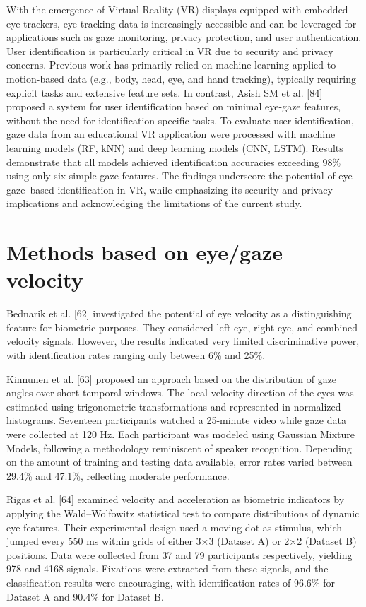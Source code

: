 \documentclass[12pt]{report}
\begin{document}
With the emergence of Virtual Reality (VR) displays equipped with embedded eye trackers, eye-tracking data is increasingly accessible and can be leveraged for applications such as gaze monitoring, privacy protection, and user authentication.
User identification is particularly critical in VR due to security and privacy concerns. 
Previous work has primarily relied on machine learning applied to motion-based data (e.g., body, head, eye, and hand tracking), typically requiring explicit tasks and extensive feature sets. 
In contrast, Asish SM et al. [84] proposed a system for user identification based on minimal eye-gaze features, without the need for identification-specific tasks. 
To evaluate user identification, gaze data from an educational VR application were processed with machine learning models (RF, kNN) and deep learning models (CNN, LSTM).
Results demonstrate that all models achieved identification accuracies exceeding 98\% using only six simple gaze features. 
The findings underscore the potential of eye-gaze–based identification in VR, while emphasizing its security and privacy implications and acknowledging the limitations of the current study.

\section{Methods based on eye/gaze velocity}

Bednarik et al. [62] investigated the potential of eye velocity as a distinguishing feature for biometric purposes.
They considered left-eye, right-eye, and combined velocity signals.
However, the results indicated very limited discriminative power, with identification rates ranging only between 6\% and 25\%.

Kinnunen et al. [63] proposed an approach based on the distribution of gaze angles over short temporal windows. 
The local velocity direction of the eyes was estimated using trigonometric transformations and represented in normalized histograms. 
Seventeen participants watched a 25-minute video while gaze data were collected at 120 Hz. 
Each participant was modeled using Gaussian Mixture Models, following a methodology reminiscent of speaker recognition. 
Depending on the amount of training and testing data available, error rates varied between 29.4\% and 47.1\%, reflecting moderate performance.

Rigas et al. [64] examined velocity and acceleration as biometric indicators by applying the Wald–Wolfowitz statistical test to compare distributions of dynamic eye features.
Their experimental design used a moving dot as stimulus, which jumped every 550 ms within grids of either 3×3 (Dataset A) or 2×2 (Dataset B) positions. 
Data were collected from 37 and 79 participants respectively, yielding 978 and 4168 signals. 
Fixations were extracted from these signals, and the classification results were encouraging, with identification rates of 96.6\% for Dataset A and 90.4\% for Dataset B.
\end{document}
